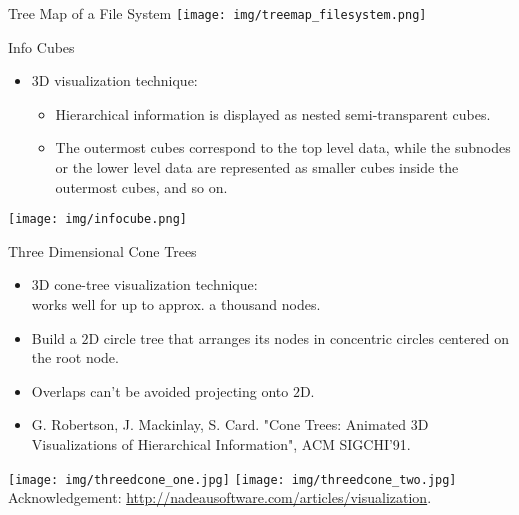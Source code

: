 \begin{frame}{Tree Map of a File System}
	\centering
	\vspace{0.5cm}
	\texttt{[image: img/treemap\_filesystem.png]}
\end{frame}

\begin{frame}{Info Cubes}
	\begin{itemize}
		\item $3$D visualization technique:
		      \begin{itemize}
			      \item Hierarchical information is displayed as nested semi-transparent cubes.
			      \item The outermost cubes correspond to the top level data, while the subnodes or the lower level data are represented as smaller cubes inside the outermost cubes, and so on.
		      \end{itemize}
	\end{itemize}
	\vspace{0.2cm}
	\centering
	\texttt{[image: img/infocube.png]}
\end{frame}

\begin{frame}{Three Dimensional Cone Trees}
	\centering
	\begin{itemize}
		\item $3$D cone-tree visualization technique:\\
		      works well for up to approx. a thousand nodes.
		\item Build a $2$D circle tree that arranges its nodes in concentric circles centered on the root node.
		\item Overlaps can't be avoided projecting onto $2$D.
		\item G. Robertson, J. Mackinlay, S. Card. "Cone Trees: Animated 3D Visualizations of Hierarchical Information", ACM SIGCHI'91.
	\end{itemize}
	\vspace{0.2cm}
	\texttt{[image: img/threedcone\_one.jpg]}\hspace{1cm}
	\texttt{[image: img/threedcone\_two.jpg]}\\
	\tiny{Acknowledgement: \href{ttp://nadeausoftware.com/articles/visualization}{http://nadeausoftware.com/articles/visualization}.}
\end{frame}

